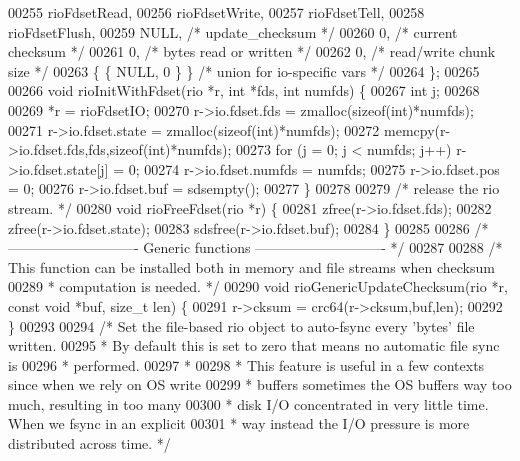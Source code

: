\begin{DoxyCode}
00255     rioFdsetRead,
00256     rioFdsetWrite,
00257     rioFdsetTell,
00258     rioFdsetFlush,
00259     NULL,           \textcolor{comment}{/* update\_checksum */}
00260     0,              \textcolor{comment}{/* current checksum */}
00261     0,              \textcolor{comment}{/* bytes read or written */}
00262     0,              \textcolor{comment}{/* read/write chunk size */}
00263     \{ \{ NULL, 0 \} \} \textcolor{comment}{/* union for io-specific vars */}
00264 \};
00265 
00266 \textcolor{keywordtype}{void} rioInitWithFdset(rio *r, \textcolor{keywordtype}{int} *fds, \textcolor{keywordtype}{int} numfds) \{
00267     \textcolor{keywordtype}{int} j;
00268 
00269     *r = rioFdsetIO;
00270     r->io.fdset.fds = zmalloc(\textcolor{keyword}{sizeof}(\textcolor{keywordtype}{int})*numfds);
00271     r->io.fdset.state = zmalloc(\textcolor{keyword}{sizeof}(\textcolor{keywordtype}{int})*numfds);
00272     memcpy(r->io.fdset.fds,fds,\textcolor{keyword}{sizeof}(\textcolor{keywordtype}{int})*numfds);
00273     \textcolor{keywordflow}{for} (j = 0; j < numfds; j++) r->io.fdset.state[j] = 0;
00274     r->io.fdset.numfds = numfds;
00275     r->io.fdset.pos = 0;
00276     r->io.fdset.buf = sdsempty();
00277 \}
00278 
00279 \textcolor{comment}{/* release the rio stream. */}
00280 \textcolor{keywordtype}{void} rioFreeFdset(rio *r) \{
00281     zfree(r->io.fdset.fds);
00282     zfree(r->io.fdset.state);
00283     sdsfree(r->io.fdset.buf);
00284 \}
00285 
00286 \textcolor{comment}{/* ---------------------------- Generic functions ---------------------------- */}
00287 
00288 \textcolor{comment}{/* This function can be installed both in memory and file streams when checksum}
00289 \textcolor{comment}{ * computation is needed. */}
00290 \textcolor{keywordtype}{void} rioGenericUpdateChecksum(rio *r, \textcolor{keyword}{const} \textcolor{keywordtype}{void} *buf, size\_t len) \{
00291     r->cksum = crc64(r->cksum,buf,len);
00292 \}
00293 
00294 \textcolor{comment}{/* Set the file-based rio object to auto-fsync every 'bytes' file written.}
00295 \textcolor{comment}{ * By default this is set to zero that means no automatic file sync is}
00296 \textcolor{comment}{ * performed.}
00297 \textcolor{comment}{ *}
00298 \textcolor{comment}{ * This feature is useful in a few contexts since when we rely on OS write}
00299 \textcolor{comment}{ * buffers sometimes the OS buffers way too much, resulting in too many}
00300 \textcolor{comment}{ * disk I/O concentrated in very little time. When we fsync in an explicit}
00301 \textcolor{comment}{ * way instead the I/O pressure is more distributed across time. */}

\end{DoxyCode}
